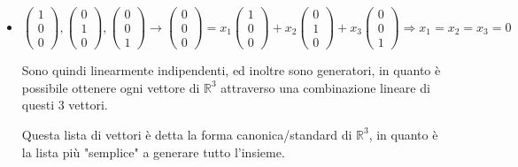 \documentclass[a4paper,12pt]{article}
\begin{document}
	\begin{itemize}
		\item $\begin{pmatrix}
			1 \\
			0 \\
			0
		\end{pmatrix},
		\begin{pmatrix}
			0 \\
			1 \\
			0
		\end{pmatrix},
		\begin{pmatrix}
			0 \\
			0 \\
			1
		\end{pmatrix} \rightarrow \begin{pmatrix}
			0 \\
			0 \\
			0
		\end{pmatrix} = x_1 \begin{pmatrix}
			1 \\
			0 \\
			0
		\end{pmatrix} + x_2 
		\begin{pmatrix}
			0 \\
			1 \\
			0
		\end{pmatrix} + x_3
		\begin{pmatrix}
			0 \\
			0 \\
			1
		\end{pmatrix} \Rightarrow x_1 = x_2 = x_3 = 0$
		
		Sono quindi linearmente indipendenti, ed inoltre sono generatori, in quanto è possibile ottenere ogni vettore di $\mathbb{R}^3$ attraverso una combinazione lineare di questi 3 vettori.
		
		Questa lista di vettori è detta la forma canonica/standard di $\mathbb{R}^3$, in quanto è la lista più "semplice" a generare tutto l'insieme. 
		

\end{itemize}
\end{document}
